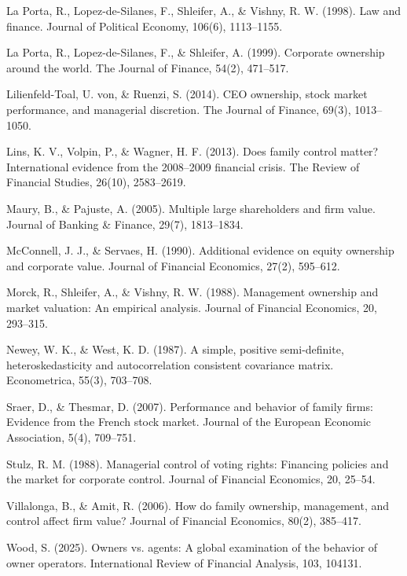 La Porta, R., Lopez-de-Silanes, F., Shleifer, A., \& Vishny, R. W. (1998). Law and finance. Journal of Political Economy, 106(6), 1113--1155.

La Porta, R., Lopez-de-Silanes, F., \& Shleifer, A. (1999). Corporate ownership around the world. The Journal of Finance, 54(2), 471--517.

Lilienfeld-Toal, U. von, \& Ruenzi, S. (2014). CEO ownership, stock market performance, and managerial discretion. The Journal of Finance, 69(3), 1013--1050.

Lins, K. V., Volpin, P., \& Wagner, H. F. (2013). Does family control matter? International evidence from the 2008--2009 financial crisis. The Review of Financial Studies, 26(10), 2583--2619.

Maury, B., \& Pajuste, A. (2005). Multiple large shareholders and firm value. Journal of Banking \& Finance, 29(7), 1813--1834.

McConnell, J. J., \& Servaes, H. (1990). Additional evidence on equity ownership and corporate value. Journal of Financial Economics, 27(2), 595--612.

Morck, R., Shleifer, A., \& Vishny, R. W. (1988). Management ownership and market valuation: An empirical analysis. Journal of Financial Economics, 20, 293--315.

Newey, W. K., \& West, K. D. (1987). A simple, positive semi-definite, heteroskedasticity and autocorrelation consistent covariance matrix. Econometrica, 55(3), 703--708.

Sraer, D., \& Thesmar, D. (2007). Performance and behavior of family firms: Evidence from the French stock market. Journal of the European Economic Association, 5(4), 709--751.

Stulz, R. M. (1988). Managerial control of voting rights: Financing policies and the market for corporate control. Journal of Financial Economics, 20, 25--54.

Villalonga, B., \& Amit, R. (2006). How do family ownership, management, and control affect firm value? Journal of Financial Economics, 80(2), 385--417.

Wood, S. (2025). Owners vs. agents: A global examination of the behavior of owner operators. International Review of Financial Analysis, 103, 104131.

\endgroup